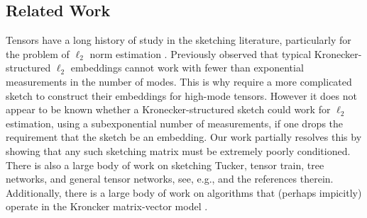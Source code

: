 \subsection{Related Work}

Tensors have a long history of study in the sketching literature, particularly for the problem of $\ell_2$ norm estimation \cite{ahle2020oblivious, ahle2019almost, pham2013fast}.
Previously \cite{ahle2019almost} observed that typical Kronecker-structured $\ell_2$ embeddings cannot work with fewer than exponential measurements in the number of modes.
This is why \cite{ahle2019almost} require a more complicated sketch to construct their embeddings for high-mode tensors.
However it does not appear to be known whether a  Kronecker-structured sketch could work for $\ell_2$ estimation, using a subexponential number of measurements, if one drops the requirement that the sketch be an embedding.
Our work partially resolves this by showing that any such sketching matrix must be extremely poorly conditioned.
There is also a large body of work on sketching Tucker, tensor train, tree networks, and general tensor networks, see, e.g., \cite{grasedyck2013literature,SWZ19,MWZ24} and the references therein.
Additionally, there is a large body of work on algorithms that (perhaps impicitly) operate in the Kroncker matrix-vector model \cite{bujanovic2021norm,bujanovic2024subspace,feldman2022entanglement,ahle2019almost,meyer2023hutchinson,avron2014subspace}.

